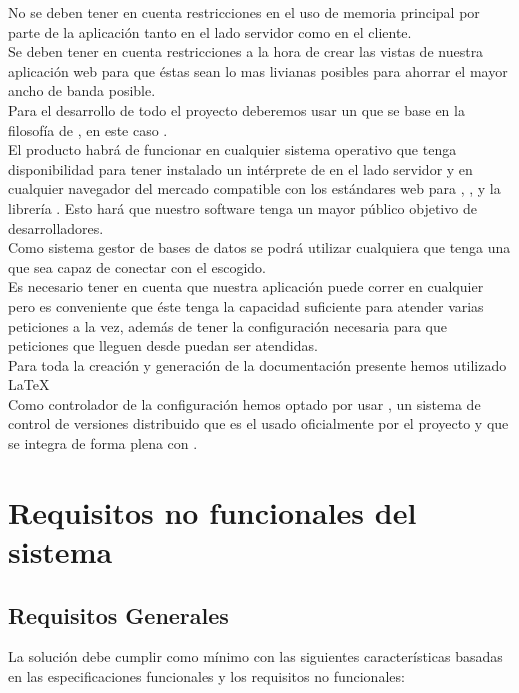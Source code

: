 No se deben tener en cuenta restricciones en el uso de memoria principal por
parte de la aplicación tanto en el lado servidor como en
el cliente.\\

Se deben tener en cuenta restricciones a la hora de crear las vistas de nuestra
aplicación web para que éstas sean lo mas livianas posibles
para ahorrar el mayor ancho de banda posible.\\

Para el desarrollo de todo el proyecto deberemos usar un  que se
base en la filosofía de , en este caso
.\\

El producto habrá de funcionar en cualquier sistema operativo que tenga
disponibilidad para tener instalado un intérprete de  en el lado
servidor y en cualquier navegador del mercado compatible con los estándares web
para , , y la librería . Esto
hará que
nuestro software tenga un mayor público objetivo de desarrolladores.\\

Como sistema gestor de bases de datos se podrá utilizar cualquiera que tenga una
 que sea capaz de conectar  con
el  escogido.\\

Es necesario tener en cuenta que nuestra aplicación puede correr en cualquier
 pero es conveniente que éste tenga la capacidad suficiente para
atender varias peticiones a la vez, además de tener la configuración necesaria
para que peticiones que lleguen desde
 puedan ser atendidas.\\

Para toda la creación y generación de la documentación presente hemos
utilizado LaTeX\\

Como controlador de la configuración hemos optado por usar , un
sistema de control de versiones distribuido que es el usado oficialmente por el
proyecto  y que se integra de forma plena con .

\section{Requisitos no funcionales del sistema}
\subsection{Requisitos Generales}
La solución debe cumplir como mínimo con las siguientes características basadas
en las especificaciones funcionales y los requisitos no funcionales:

